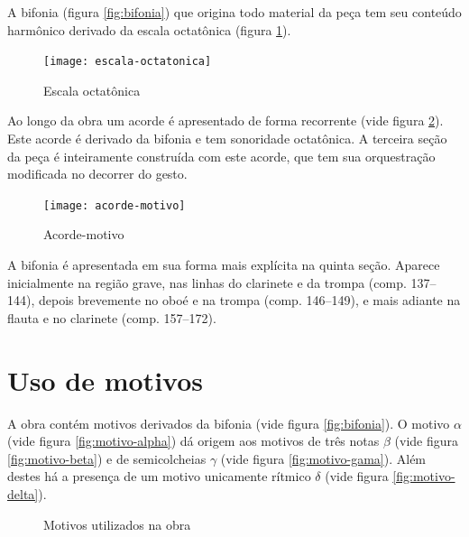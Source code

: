 A bifonia (figura \ref{fig:bifonia}) que origina todo material da peça
tem seu conteúdo harmônico derivado da escala octatônica (figura
\ref{fig:escala-octatonica}).

\begin{figure}
  \centering
  \texttt{[image: escala-octatonica]}
  \caption{Escala octatônica}
  \label{fig:escala-octatonica}
\end{figure}

Ao longo da obra um acorde é apresentado de forma recorrente (vide
figura \ref{fig:acorde-motivo}). Este acorde é derivado da bifonia e
tem sonoridade octatônica. A terceira seção da peça é inteiramente
construída com este acorde, que tem sua orquestração modificada no
decorrer do gesto.

\begin{figure}
  \centering
  \texttt{[image: acorde-motivo]}
  \caption{Acorde-motivo}
  \label{fig:acorde-motivo}
\end{figure}


A bifonia é apresentada em sua forma mais explícita na quinta
seção. Aparece inicialmente na região grave, nas linhas do clarinete e
da trompa (comp. 137--144), depois brevemente no oboé e na trompa
(comp. 146--149), e mais adiante na flauta e no clarinete
(comp. 157--172).

\section{Uso de motivos}
\label{sec:uso-de-motivos}

A obra contém motivos derivados da bifonia (vide figura
\ref{fig:bifonia}). O motivo $\alpha$ (vide figura
\ref{fig:motivo-alpha}) dá origem aos motivos de três notas $\beta$
(vide figura \ref{fig:motivo-beta}) e de semicolcheias $\gamma$ (vide
figura \ref{fig:motivo-gama}). Além destes há a presença de um motivo
unicamente rítmico $\delta$ (vide figura \ref{fig:motivo-delta}).

\begin{figure}
  \centering

  \caption{Motivos utilizados na obra}
  \label{fig:motivos-utilizados}
\end{figure}

